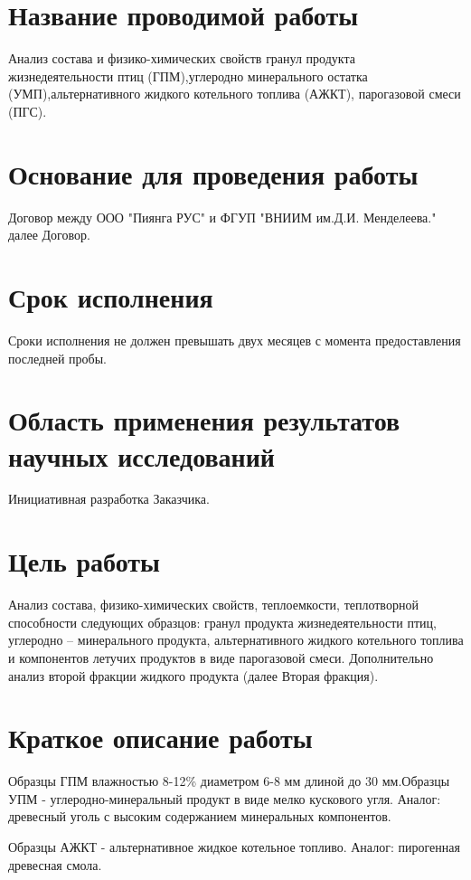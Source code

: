 \documentclass[russian,utf8]{eskdtext}
\begin{document}
\maketitle
\tableofcontents
\newpage
\section{Название проводимой работы}
Анализ состава и физико-химических свойств гранул продукта жизнедеятельности птиц (ГПМ),углеродно минерального остатка (УМП),альтернативного жидкого котельного топлива (АЖКТ), парогазовой смеси (ПГС).
\section{Основание для проведения работы}
Договор между ООО "Пиянга РУС" и ФГУП "ВНИИМ им.Д.И. Менделеева." далее Договор.
\section{Срок исполнения}
Сроки исполнения не должен превышать двух месяцев с момента предоставления последней пробы.
\section{Область применения результатов научных исследований}
Инициативная разработка Заказчика.

\section{Цель работы}
Анализ состава, физико-химических свойств, теплоемкости, теплотворной способности следующих образцов: гранул продукта жизнедеятельности птиц, углеродно -- минерального продукта, альтернативного жидкого котельного топлива и компонентов летучих продуктов в виде парогазовой смеси. Дополнительно анализ второй фракции жидкого продукта (далее Вторая фракция).

\section{Краткое описание работы}
Образцы ГПМ влажностью 8-12\% диаметром 6-8 мм длиной до 30 мм.Образцы	УПМ - углеродно-минеральный продукт в виде мелко кускового угля. Аналог: древесный
уголь с высоким содержанием минеральных компонентов.
   
Образцы АЖКТ - альтернативное жидкое котельное топливо. Аналог: пирогенная древесная смола.
   
\end{document}
